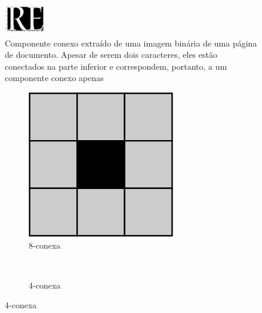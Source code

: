 \documentclass{article}
\begin{document}
		
		\begin{figure}[H]			
			\caption[Componente conexo]
			{Componente conexo extraído de uma imagem binária de uma página de documento. Apesar de serem dois caracteres, eles estão conectados na parte inferior e correspondem, portanto, a um componente conexo apenas}
			\centering
			\includegraphics[height=50px]{1.png}			
		\end{figure}
		\begin{figure}[H]			
			\caption[Vizinhança do pixel]
			{Vizinhança do pixel}
			\centering
			\begin{subfigure}[b]{50px}				
				\caption{8-conexa}
				\includegraphics[width=\textwidth]{2.png}
			\end{subfigure}
			~
			\begin{subfigure}[b]{50px}				
				\caption{4-conexa}

\end{subfigure}
\end{figure}
\end{document}
